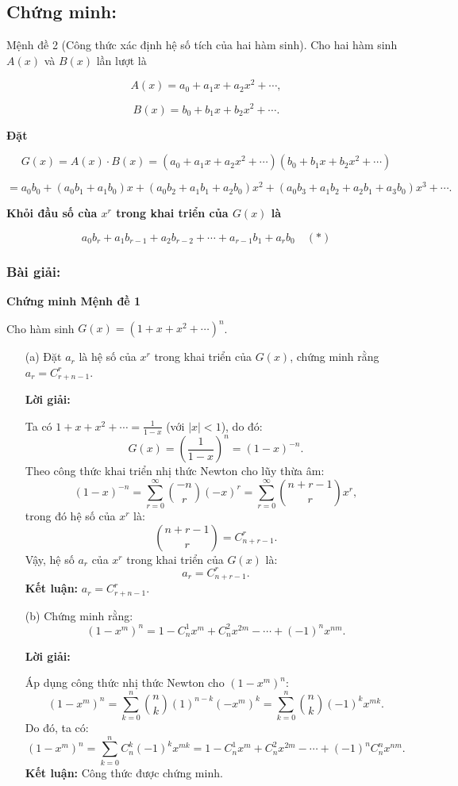 \documentclass[a4paper,12pt]{article}
\begin{document}
\subsection*{Chứng minh:} 
Mệnh đề 2 (Công thức xác định hệ số tích của hai hàm sinh). Cho hai hàm sinh \( A(x) \) và \( B(x) \) lần lượt là

\[
A(x) = a_0 + a_1 x + a_2 x^2 + \cdots,
\]

\[
B(x) = b_0 + b_1 x + b_2 x^2 + \cdots.
\]

\textbf{Đặt}

\[
G(x) = A(x) \cdot B(x) = (a_0 + a_1 x + a_2 x^2 + \cdots)(b_0 + b_1 x + b_2 x^2 + \cdots)
\]

\[
= a_0 b_0 + (a_0 b_1 + a_1 b_0) x + (a_0 b_2 + a_1 b_1 + a_2 b_0) x^2 + (a_0 b_3 + a_1 b_2 + a_2 b_1 + a_3 b_0) x^3 + \cdots.
\]

\textbf{Khỏi đầu số cùa \( x^r \) trong khai triển của \( G(x) \) là}

\[
a_0 b_r + a_1 b_{r-1} + a_2 b_{r-2} + \cdots + a_{r-1} b_1 + a_r b_0 \quad (*)
\]

\subsubsection*{Bài giải:}
\textbf{Chứng minh Mệnh đề 1}

Cho hàm sinh \( G(x) = (1 + x + x^2 + \cdots)^n \).

\begin{enumerate}
    \item[(a)] Đặt \( a_r \) là hệ số của \( x^r \) trong khai triển của \( G(x) \), chứng minh rằng \( a_r = C_{r+n-1}^{r} \).

    \textbf{Lời giải:}

    Ta có \( 1 + x + x^2 + \cdots = \frac{1}{1-x} \) (với \( |x| < 1 \)), do đó:
    \[
    G(x) = \left( \frac{1}{1-x} \right)^n = (1-x)^{-n}.
    \]
    Theo công thức khai triển nhị thức Newton cho lũy thừa âm:
    \[
    (1-x)^{-n} = \sum_{r=0}^{\infty} \binom{-n}{r} (-x)^r = \sum_{r=0}^{\infty} \binom{n+r-1}{r} x^r,
    \]
    trong đó hệ số của \( x^r \) là:
    \[
    \binom{n+r-1}{r} = C_{n+r-1}^{r}.
    \]
    Vậy, hệ số \( a_r \) của \( x^r \) trong khai triển của \( G(x) \) là:
    \[
    a_r = C_{n+r-1}^{r}.
    \]
    \textbf{Kết luận:} \( a_r = C_{r+n-1}^{r} \).

    \item[(b)] Chứng minh rằng:
    \[
    (1 - x^m)^n = 1 - C_n^1 x^m + C_n^2 x^{2m} - \cdots + (-1)^n x^{nm}.
    \]

    \textbf{Lời giải:}

    Áp dụng công thức nhị thức Newton cho \( (1 - x^m)^n \):
    \[
    (1 - x^m)^n = \sum_{k=0}^{n} \binom{n}{k} (1)^{n-k} (-x^m)^k = \sum_{k=0}^{n} \binom{n}{k} (-1)^k x^{mk}.
    \]
    Do đó, ta có:
    \[
    (1 - x^m)^n = \sum_{k=0}^{n} C_n^k (-1)^k x^{mk} = 1 - C_n^1 x^m + C_n^2 x^{2m} - \cdots + (-1)^n C_n^n x^{nm}.
    \]
    \textbf{Kết luận:} Công thức được chứng minh.
\end{enumerate}
\end{document}
